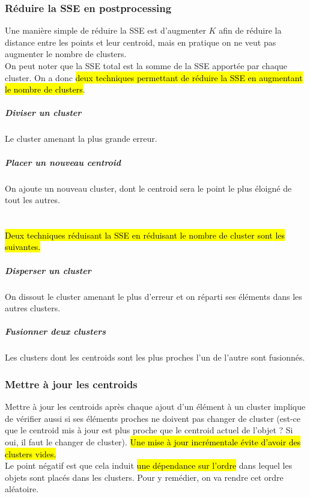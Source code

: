 \documentclass[letterpaper, 12pt]{article}
\newcommand{\alinea}{
\hspace*{0.5cm}}
\begin{document}
			\subsubsection{Réduire la SSE en postprocessing}
				\alinea Une manière simple de réduire la SSE est d'augmenter
					$K$ afin de réduire la distance entre les points et leur
					centroid, mais en pratique on ne veut pas augmenter le
					nombre de clusters.\\
				\alinea On peut noter que la SSE total est la somme de
					la SSE apportée par chaque cluster. On a donc \hl{deux
					techniques permettant de réduire la SSE en augmentant
					le nombre de clusters}.
				\subparagraph{Diviser un cluster} Le cluster amenant la
					plus grande erreur.
				\subparagraph{Placer un nouveau centroid} On ajoute
					un nouveau cluster, dont le centroid sera le point le 
					plus éloigné de tout les autres.\\
				~\\~\\
				\alinea \hl{Deux techniques réduisant la SSE en réduisant le
					nombre de cluster sont les suivantes.}
				\subparagraph{Disperser un cluster} On dissout le cluster
					amenant le plus d'erreur et on réparti ses éléments dans
					les autres clusters.
				\subparagraph{Fusionner deux clusters} Les clusters
					dont les centroids sont les plus proches l'un de l'autre
					sont fusionnés.
			\subsubsection{Mettre à jour les centroids}
				\alinea Mettre à jour les centroids après chaque ajout
					d'un élément à un cluster implique de vérifier
					aussi si ses éléments proches ne doivent pas changer 
					de cluster (est-ce que le centroid mis à jour
					est plus proche que le centroid actuel de l'objet ? Si
					oui, il faut le changer de cluster).\hl{ Une mise à jour 
					incrémentale évite d'avoir des clusters vides.}\\
				\alinea Le point négatif est que cela induit \hl{une dépendance
					sur l'ordre} dans lequel les objets sont placés dans
					les clusters. Pour y remédier, on va rendre cet ordre 
					aléatoire.
\end{document}
